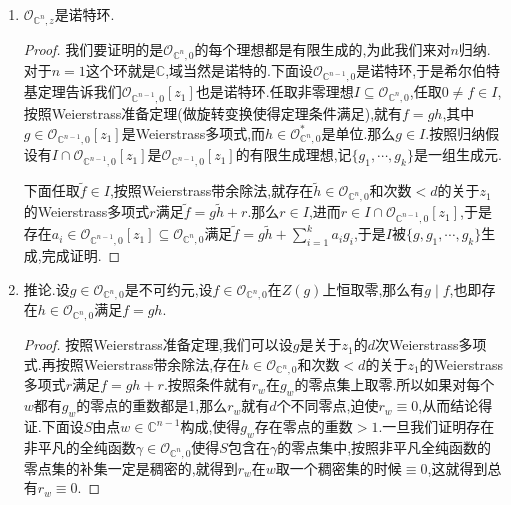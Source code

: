 \begin{enumerate}
\begin{proof}
        这个积分得到次数$<d$的关于$z_1$的Weierstrass多项式.
    \end{proof}
    \item $\mathscr{O}_{\mathbb{C}^n,z}$是诺特环.
    \begin{proof}
    	
    	我们要证明的是$\mathscr{O}_{\mathbb{C}^n,0}$的每个理想都是有限生成的,为此我们来对$n$归纳.对于$n=1$这个环就是$\mathbb{C}$,域当然是诺特的.下面设$\mathscr{O}_{\mathbb{C}^{n-1},0}$是诺特环,于是希尔伯特基定理告诉我们$\mathscr{O}_{\mathbb{C}^{n-1},0}[z_1]$也是诺特环.任取非零理想$I\subseteq\mathscr{O}_{\mathbb{C}^n,0}$,任取$0\not=f\in I$,按照Weierstrass准备定理(做旋转变换使得定理条件满足),就有$f=gh$,其中$g\in\mathscr{O}_{\mathbb{C}^{n-1},0}[z_1]$是Weierstrass多项式,而$h\in\mathscr{O}_{\mathbb{C}^n,0}^*$是单位.那么$g\in I$.按照归纳假设有$I\cap\mathscr{O}_{\mathbb{C}^{n-1},0}[z_1]$是$\mathscr{O}_{\mathbb{C}^{n-1},0}[z_1]$的有限生成理想,记$\{g_1,\cdots,g_k\}$是一组生成元.
    	
    	\qquad
    	
    	下面任取$\widetilde{f}\in I$,按照Weierstrass带余除法,就存在$\widetilde{h}\in\mathscr{O}_{\mathbb{C}^n,0}$和次数$<d$的关于$z_1$的Weierstrass多项式$r$满足$\widetilde{f}=g\widetilde{h}+r$.那么$r\in I$,进而$r\in I\cap\mathscr{O}_{\mathbb{C}^{n-1},0}[z_1]$,于是存在$a_i\in\mathscr{O}_{\mathbb{C}^{n-1},0}[z_1]\subseteq\mathscr{O}_{\mathbb{C}^n,0}$满足$\widetilde{f}=g\widetilde{h}+\sum_{i=1}^ka_ig_i$,于是$I$被$\{g,g_1,\cdots,g_k\}$生成,完成证明.
    \end{proof}
    \item 推论.设$g\in\mathscr{O}_{\mathbb{C}^n,0}$是不可约元,设$f\in\mathscr{O}_{\mathbb{C}^n,0}$在$Z(g)$上恒取零,那么有$g\mid f$,也即存在$h\in\mathscr{O}_{\mathbb{C}^n,0}$满足$f=gh$.
    \begin{proof}
    	
    	按照Weierstrass准备定理,我们可以设$g$是关于$z_1$的$d$次Weierstrass多项式.再按照Weierstrass带余除法,存在$h\in\mathscr{O}_{\mathbb{C}^n,0}$和次数$<d$的关于$z_1$的Weierstrass多项式$r$满足$f=gh+r$.按照条件就有$r_w$在$g_w$的零点集上取零.所以如果对每个$w$都有$g_w$的零点的重数都是1,那么$r_w$就有$d$个不同零点,迫使$r_w\equiv0$,从而结论得证.下面设$S$由点$w\in\mathbb{C}^{n-1}$构成,使得$g_w$存在零点的重数$>1$.一旦我们证明存在非平凡的全纯函数$\gamma\in\mathscr{O}_{\mathbb{C}^n,0}$使得$S$包含在$\gamma$的零点集中,按照非平凡全纯函数的零点集的补集一定是稠密的,就得到$r_w$在$w$取一个稠密集的时候$\equiv0$,这就得到总有$r_w\equiv0$.
    	
    	\qquad
    	

\end{proof}
\end{enumerate}
